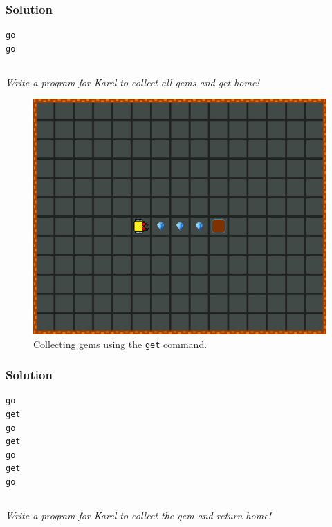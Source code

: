 \documentclass[article,A4,12pt]{llncs}
\begin{document}
\subsubsection*{Solution}
\begin{verbatim}
go
go
\end{verbatim}

\newpage
\subsection{}

{\em Write a program for Karel to collect all gems and get home! 

\begin{figure}[!ht]
\begin{center}
\includegraphics[height=0.4\textwidth]{imgk/b02.png}
\end{center}
\vspace{-4mm}
\caption{Collecting gems using the {\tt get} command.}
\label{fig:b02}
\vspace{-4mm}
\end{figure}
\noindent

\subsubsection{Solution}
\begin{verbatim}
go
get
go
get
go
get 
go
\end{verbatim}

\newpage
\subsection{}

{\em Write a program for Karel to collect the gem and return home! 

}}
\end{document}
